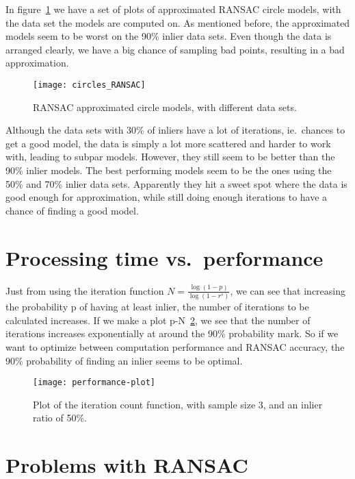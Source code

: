 In figure~\ref{fig:circles_RANSAC} we have a set of plots of approximated
RANSAC circle models, with the data set the models are computed on. As
mentioned before, the approximated models seem to be worst on the 90\% inlier
data sets. Even though the data is arranged clearly, we have a big chance of
sampling bad points, resulting in a bad approximation.

\begin{figure}[H]
  \centering
  \texttt{[image: circles\_RANSAC]}
  \caption{RANSAC approximated circle models, with different data sets.}\label{fig:circles_RANSAC}
\end{figure}

Although the data sets with 30\% of inliers have a lot of iterations, ie.\
chances to get a good model, the data is simply a lot more scattered and harder
to work with, leading to subpar models. However, they still seem to be better
than the 90\% inlier models. The best performing models seem to be the ones
using the 50\% and 70\% inlier data sets. Apparently they hit a sweet spot
where the data is good enough for approximation, while still doing enough
iterations to have a chance of finding a good model.

\section{Processing time vs.\ performance}

Just from using the iteration function \( N = \frac{\log(1-p)}{\log(1-r^s)} \),
we can see that increasing the probability p of having at least inlier, the
number of iterations to be calculated increases. If we make a plot
p-N~\ref{fig:performance-plot}, we see
that the number of iterations increases exponentially at around the 90\%
probability mark. So if we want to optimize between computation performance and
RANSAC accuracy, the 90\% probability of finding an inlier seems to be optimal.

\begin{figure}[H]
  \centering
  \texttt{[image: performance-plot]}
  \caption{Plot of the iteration count function, with sample size 3, and an
  inlier ratio of 50\%.}\label{fig:performance-plot}
\end{figure}

\section{Problems with RANSAC}

